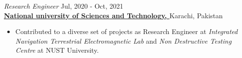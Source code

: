 \documentclass[margin, 10pt]{res} %
\begin{document}
\begin{resume}
\begin{itemize}
\begin{itemize}
    \end{itemize}
\end{itemize}



\emph{Research Engineer} \hfill {\small Jul, 2020 -  Oct, 2021} \\
\href{https://pnec.nust.edu.pk/}{\textbf{National university of Sciences and Technology, \href{https://pnec.nust.edu.pk/}{}}} Karachi, Pakistan
\begin{itemize}

\item Contributed to a diverse set of projects as Research Engineer at \emph{Integrated Navigation Terrestrial Electromagnetic Lab} and \emph{Non Destructive Testing Centre} at NUST University.



\end{itemize}
\end{resume}
\end{document}
